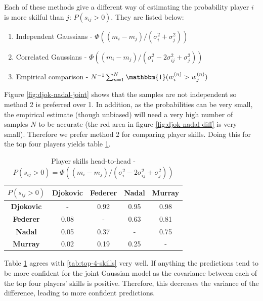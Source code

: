 \documentclass[]{article}
\begin{document}
Each of these methods give a different way of estimating the probability player $i$ is more skilful than $j$: $P(s_{ij} > 0)$. They are listed below:

\begin{enumerate}
	\item Independent Gaussians - $\Phi((m_i - m_j)/(\sigma_i^2 + \sigma_j^2))$
	\item Correlated Gaussians - $\Phi((m_i - m_j)/(\sigma_i^2 - 2\sigma_{ij}^2 + \sigma_j^2))$
	\item Empirical comparison - $N^{-1} \sum_{n=1}^{N} \mathbbm{1} (w_i^{(n)} > w_j^{(n)})$
\end{enumerate}

Figure \ref{fig:djok-nadal-joint} shows that the samples are not independent so method 2 is preferred over 1. In addition, as the probabilities can be very small, the empirical estimate (though unbiased) will need a very high number of samples $N$ to be accurate (the red area in figure \ref{fig:djok-nadal-diff} is very small). Therefore we prefer method 2 for comparing player skills. Doing this for the top four players yields table \ref{tab:top-4-gibbs}.

\begin{table}[!h]
	\centering
	\begin{tabular}{c | c c c c}
		$P(s_{ij} > 0)$ & \textbf{Djokovic} & \textbf{Federer} & \textbf{Nadal} & \textbf{Murray} \\ \hline
		\textbf{Djokovic}      & -                 & 0.92             & 0.95           & 0.98            \\
		\textbf{Federer}       & 0.08              & -                & 0.63           & 0.81            \\
		\textbf{Nadal}         & 0.05              & 0.37             & -              & 0.75            \\
		\textbf{Murray}        & 0.02              & 0.19             & 0.25           & -              
	\end{tabular}
	\caption{Player skills head-to-head - $P(s_{ij} > 0) = \Phi((m_i - m_j)/(\sigma_i^2 - 2\sigma_{ij}^2 + \sigma_j^2))$}
	\label{tab:top-4-gibbs}
\end{table}

Table \ref{tab:top-4-gibbs} agrees with \ref{tab:top-4-skills} very well. If anything the predictions tend to be more confident for the joint Gaussian model as the covariance between each of the top four players' skills is positive. Therefore, this decreases the variance of the difference, leading to more confident predictions.
\end{document}
